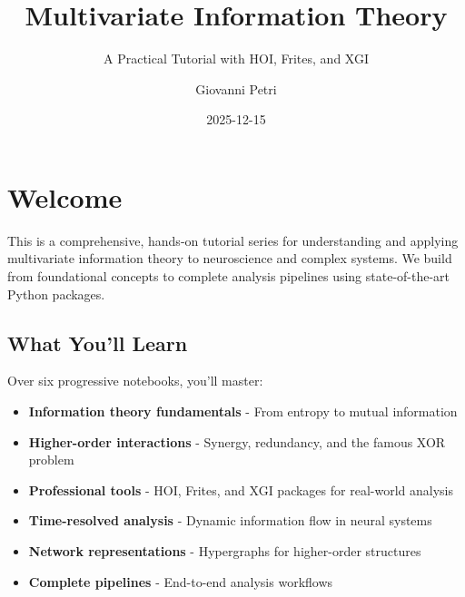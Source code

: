 \documentclass[
  11pt,
  letterpaper,
  oneside,
  openany]{book}
\title{Multivariate Information Theory}
\subtitle{A Practical Tutorial with HOI, Frites, and XGI}
\author{Giovanni Petri}
\date{2025-12-15}
\providecommand{\tightlist}{%
  \setlength{\itemsep}{0pt}\setlength{\parskip}{0pt}}
\renewcommand*\contentsname{Table of contents}
\newcommand\contentsname{Table of contents}
\begin{document}
\frontmatter
\maketitle

\renewcommand*\contentsname{Table of contents}
{
\hypersetup{linkcolor=}
\setcounter{tocdepth}{2}
\tableofcontents
}

\mainmatter
{}

\chapter*{Welcome}\label{welcome}


\begin{tcolorbox}[enhanced jigsaw, coltitle=black, breakable, colframe=quarto-callout-note-color-frame, bottomrule=.15mm, colbacktitle=quarto-callout-note-color!10!white, title=\textcolor{quarto-callout-note-color}{\faInfo}\hspace{0.5em}{About This Tutorial}, opacitybacktitle=0.6, bottomtitle=1mm, toptitle=1mm, arc=.35mm, left=2mm, colback=white, rightrule=.15mm, titlerule=0mm, leftrule=.75mm, toprule=.15mm, opacityback=0]

This is a comprehensive, hands-on tutorial series for understanding and
applying multivariate information theory to neuroscience and complex
systems. We build from foundational concepts to complete analysis
pipelines using state-of-the-art Python packages.

\end{tcolorbox}

\section*{What You'll Learn}\label{what-youll-learn}


Over six progressive notebooks, you'll master:

\begin{itemize}
\tightlist
\item
  \textbf{Information theory fundamentals} - From entropy to mutual
  information
\item
  \textbf{Higher-order interactions} - Synergy, redundancy, and the
  famous XOR problem
\item
  \textbf{Professional tools} - HOI, Frites, and XGI packages for
  real-world analysis
\item
  \textbf{Time-resolved analysis} - Dynamic information flow in neural
  systems
\item
  \textbf{Network representations} - Hypergraphs for higher-order
  structures
\item
  \textbf{Complete pipelines} - End-to-end analysis workflows
\end{itemize}
\end{document}
